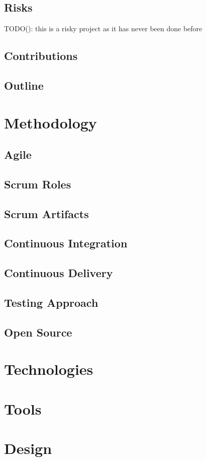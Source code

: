 \documentclass{article}
\begin{document}
\subsection{Risks}
TODO(): this is a risky project as it has never been done before 

\subsection{Contributions}
\subsection{Outline}
\section{Methodology}
\subsection{Agile}
\subsection{Scrum Roles}
\subsection{Scrum Artifacts}
\subsection{Continuous Integration}
\subsection{Continuous Delivery}
\subsection{Testing Approach}
\subsection{Open Source}
\section{Technologies}
\section{Tools}
\section{Design}
\end{document}
